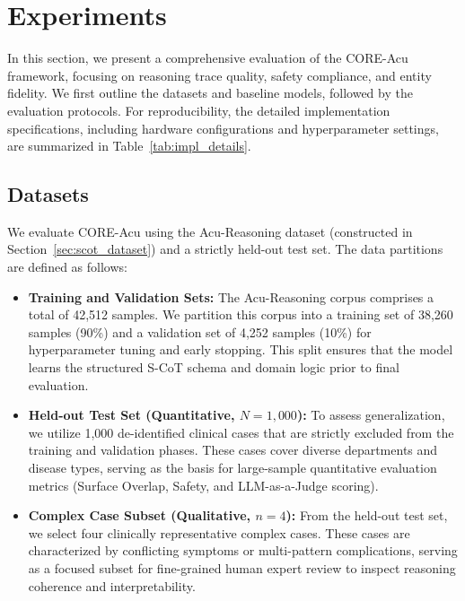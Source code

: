 \documentclass[preprint,5p,times,twocolumn,fleqn]{elsarticle}
\begin{document}
\section{Experiments}
In this section, we present a comprehensive evaluation of the CORE-Acu framework, focusing on reasoning trace quality, safety compliance, and entity fidelity. We first outline the datasets and baseline models, followed by the evaluation protocols. For reproducibility, the detailed implementation specifications, including hardware configurations and hyperparameter settings, are summarized in Table~\ref{tab:impl_details}.
\subsection{Datasets}
\label{sec:datasets}
We evaluate CORE-Acu using the Acu-Reasoning dataset (constructed in Section~\ref{sec:scot_dataset}) and a strictly held-out test set. The data partitions are defined as follows:

\begin{itemize}
    \item \textbf{Training and Validation Sets:} 
    The Acu-Reasoning corpus comprises a total of 42,512 samples. We partition this corpus into a training set of 38,260 samples (90\%) and a validation set of 4,252 samples (10\%) for hyperparameter tuning and early stopping. This split ensures that the model learns the structured S-CoT schema and domain logic prior to final evaluation.

    \item \textbf{Held-out Test Set (Quantitative, $N=1,000$):} 
    To assess generalization, we utilize 1,000 de-identified clinical cases that are strictly excluded from the training and validation phases. These cases cover diverse departments and disease types, serving as the basis for large-sample quantitative evaluation metrics (Surface Overlap, Safety, and LLM-as-a-Judge scoring).

    \item \textbf{Complex Case Subset (Qualitative, $n=4$):} 
    From the held-out test set, we select four clinically representative complex cases. These cases are characterized by conflicting symptoms or multi-pattern complications, serving as a focused subset for fine-grained human expert review to inspect reasoning coherence and interpretability.
\end{itemize}
\end{document}
